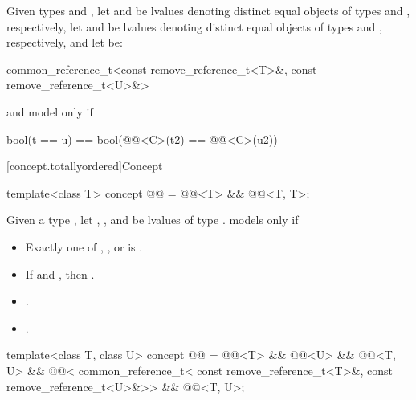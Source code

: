 \begin{itemdescr}
\pnum
Given types  and ,
let  and  be lvalues
denoting distinct equal objects of types  and
, respectively,
let  and  be lvalues
denoting distinct equal objects of types  and
, respectively, and
let  be:
\begin{codeblock}
common_reference_t<const remove_reference_t<T>&, const remove_reference_t<U>&>
\end{codeblock}
 and  model
 only if
\begin{codeblock}
bool(t == u) == bool(@@<C>(t2) == @@<C>(u2))
\end{codeblock}
\end{itemdescr}

[concept.totallyordered]{Concept }

\begin{itemdecl}
template<class T>
  concept @@ =
    @@<T> && @@<T, T>;
\end{itemdecl}

\begin{itemdescr}
\pnum
Given a type , let , , and  be
lvalues of type .
 models  only if

\begin{itemize}
\item Exactly one of , , or
       is .
\item If  and , then
      .
\item {}.
\item {}.
\end{itemize}

\end{itemdescr}

\begin{itemdecl}
template<class T, class U>
  concept @@ =
    @@<T> && @@<U> &&
    @@<T, U> &&
    @@<
      common_reference_t<
        const remove_reference_t<T>&,
        const remove_reference_t<U>&>> &&
    @@<T, U>;
\end{itemdecl}

